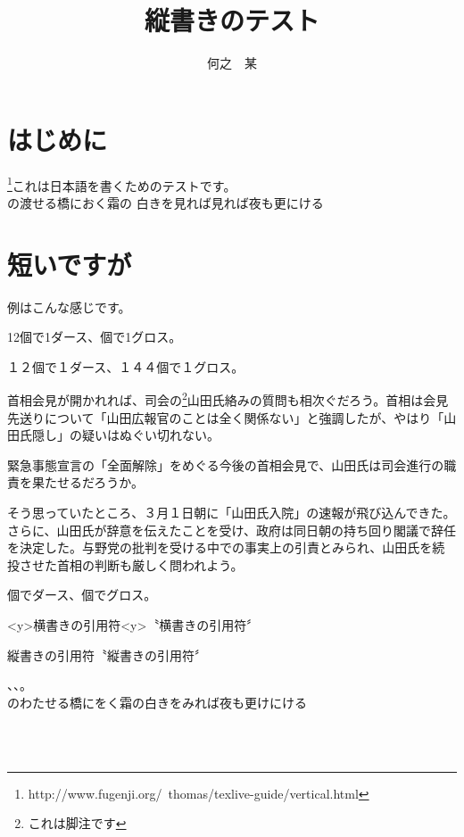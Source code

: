 \documentclass[a4j,12pt,twocolumn]{ltjtarticle}
\title{縦書きのテスト}
\author{何之　某}
\date{}
\begin{document}
\maketitle
\section{はじめに}
\footnote{http://www.fugenji.org/~thomas/texlive-guide/vertical.html}これは日本語を書くためのテストです。\\
の渡せる橋におく霜の 白きを見れば見れば夜も更にける\\
\section{短いですが}

例はこんな感じです。

12個で1ダース、個で1グロス。

１２個で１ダース、１４４個で１グロス。


首相会見が開かれれば、司会の\footnote{これは脚注です}山田氏絡みの質問も相次ぐだろう。首相は会見先送りについて「山田広報官のことは全く関係ない」と強調したが、やはり「山田氏隠し」の疑いはぬぐい切れない。

緊急事態宣言の「全面解除」をめぐる今後の首相会見で、山田氏は司会進行の職責を果たせるだろうか。

そう思っていたところ、３月１日朝に「山田氏入院」の速報が飛び込んできた。さらに、山田氏が辞意を伝えたことを受け、政府は同日朝の持ち回り閣議で辞任を決定した。与野党の批判を受ける中での事実上の引責とみられ、山田氏を続投させた首相の判断も厳しく問われよう。

個でダース、個でグロス。

\pbox<y>{横書きの引用符}\pbox<y>{〝横書きの引用符〞}

縦書きの引用符〝縦書きの引用符〞

、、。
\\
のわたせる橋にをく霜の白きをみれば夜も更けにける

\noindent
{}\
\\
\
\\
\ltjruby[tbaseheight=-1]{本}{ほん}
\end{document}
